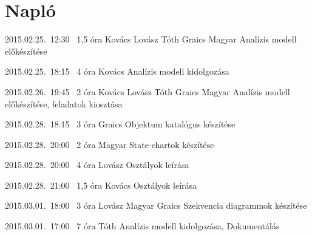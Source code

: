 %
\pagebreak
\section{Napló}

\begin{naplo}

\bejegyzes
{2015.02.25.~12:30~} %
{1,5 óra} %
{Kovács\newline
Lovász\newline
Tóth\newline
Graics\newline
Magyar
} %
{Analízis modell előkészítése}

\bejegyzes
{2015.02.25.~18:15~}
{4 óra}
{Kovács}
{Analízis modell kidolgozása}

\bejegyzes
{2015.02.26.~19:45~} %
{2 óra} %
{Kovács\newline
Lovász\newline
Tóth\newline
Graics\newline
Magyar
} %
{Analízis modell előkészítése, feladatok kiosztása}

\bejegyzes
{2015.02.28.~18:15~}
{3 óra}
{Graics}
{Objektum katalógus készítése}

\bejegyzes
{2015.02.28.~20:00~}
{2 óra}
{Magyar}
{State-chartok készítése}

\bejegyzes
{2015.02.28.~20:00~}
{4 óra}
{Lovász}
{Osztályok leírása}

\bejegyzes
{2015.02.28.~21:00~}
{1,5 óra}
{Kovács}
{Osztályok leírása}

\bejegyzes
{2015.03.01.~18:00~}
{3 óra}
{Lovász\newline
Magyar\newline
Graics
}
{Szekvencia diagrammok készítése}

\bejegyzes
{2015.03.01.~17:00~}
{7 óra}
{Tóth}
{Analízis modell kidolgozása, Dokumentálás}

\end{naplo}

